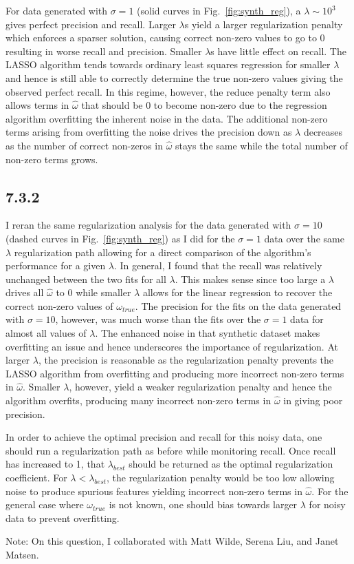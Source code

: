 \documentclass[12pt]{amsart}
\begin{document}
For data generated with $\sigma = 1$ (solid curves in Fig.~\ref{fig:synth_reg}), a $\lambda \sim 10^3$ gives perfect precision and recall.  Larger $\lambda$s yield a larger regularization penalty which enforces a sparser solution, causing correct non-zero values to go to 0 resulting in worse recall and precision.  Smaller $\lambda$s have little effect on recall.  The LASSO algorithm tends towards ordinary least squares regression for smaller $\lambda$ and hence is still able to correctly determine the true non-zero values giving the observed perfect recall.  In this regime, however, the reduce penalty term also allows terms in $\hat{\omega}$ that should be 0 to become non-zero due to the regression algorithm overfitting the inherent noise in the data.  The additional non-zero terms arising from overfitting the noise drives the precision down as $\lambda$ decreases as the number of correct non-zeros in $\hat{\omega}$ stays the same while the total number of non-zero terms grows.

\subsection*{7.3.2}

I reran the same regularization analysis for the data generated with $\sigma = 10$ (dashed curves in Fig.~\ref{fig:synth_reg}) as I did for the $\sigma = 1$ data over the same $\lambda$ regularization path allowing for a direct comparison of the algorithm's performance for a given $\lambda$.  In general, I found that the recall was relatively unchanged between the two fits for all $\lambda$.  This makes sense since too large a $\lambda$ drives all $\hat{\omega}$ to 0 while smaller $\lambda$ allows for the linear regression to recover the correct non-zero values of $\omega_{true}$.  The precision for the fits on the data generated with $\sigma = 10$, however, was much worse than the fits over the $\sigma = 1$ data for almost all values of $\lambda$.  The enhanced noise in that synthetic dataset makes overfitting an issue and hence underscores the importance of regularization.  At larger $\lambda$, the precision is reasonable as the regularization penalty prevents the LASSO algorithm from overfitting and producing more incorrect non-zero terms in $\hat{\omega}$.  Smaller $\lambda$, however, yield a weaker regularization penalty and hence the algorithm overfits, producing many incorrect non-zero terms in $\hat{\omega}$ in giving poor precision.  

In order to achieve the optimal precision and recall for this noisy data, one should run a regularization path as before while monitoring recall.  Once recall has increased to 1, that $\lambda_{best}$ should be returned as the optimal regularization coefficient.  For $\lambda < \lambda_{best}$, the regularization penalty would be too low allowing noise to produce spurious features yielding incorrect non-zero terms in $\hat{\omega}$.  For the general case where $\omega_{true}$ is not known, one should bias towards larger $\lambda$ for noisy data to prevent overfitting.

Note: On this question, I collaborated with Matt Wilde, Serena Liu, and Janet Matsen.
\end{document}
